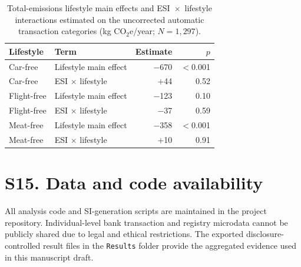 \documentclass[12pt]{article}
\begin{document}
\begin{table}[!htbp]
\centering
\small
\caption{Total-emissions lifestyle main effects and ESI~$\times$~lifestyle interactions estimated on the uncorrected automatic transaction categories (kg CO$_2$e/year; $N=1{,}297$).}
\label{tab:recategorized}
\begin{tabular}{llrr}
\toprule
\textbf{Lifestyle} & \textbf{Term} & \textbf{Estimate} & \textbf{$p$} \\
\midrule
Car-free    & Lifestyle main effect      & $-$670 & $<$0.001 \\
Car-free    & ESI $\times$ lifestyle      & $+$44  & 0.52 \\
Flight-free & Lifestyle main effect      & $-$123 & 0.10 \\
Flight-free & ESI $\times$ lifestyle      & $-$37  & 0.59 \\
Meat-free   & Lifestyle main effect      & $-$358 & $<$0.001 \\
Meat-free   & ESI $\times$ lifestyle      & $+$10  & 0.91 \\
\bottomrule
\end{tabular}
\end{table}

\section*{S15. Data and code availability}
All analysis code and SI-generation scripts are maintained in the project repository. Individual-level bank transaction and registry microdata cannot be publicly shared due to legal and ethical restrictions. The exported disclosure-controlled result files in the \texttt{Results} folder provide the aggregated evidence used in this manuscript draft.



\end{document}
